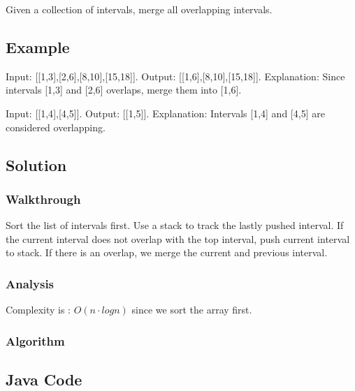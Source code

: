 \documentclass[]{book}
\begin{document}
Given a collection of intervals, merge all overlapping intervals.

\hypertarget{example-17}{%
\subsection{Example}\label{example-17}}

Input: {[}{[}1,3{]},{[}2,6{]},{[}8,10{]},{[}15,18{]}{]}. Output: {[}{[}1,6{]},{[}8,10{]},{[}15,18{]}{]}. Explanation: Since intervals {[}1,3{]} and {[}2,6{]} overlaps, merge them into {[}1,6{]}.

Input: {[}{[}1,4{]},{[}4,5{]}{]}. Output: {[}{[}1,5{]}{]}. Explanation: Intervals {[}1,4{]} and {[}4,5{]} are considered overlapping.

\hypertarget{solution-13}{%
\subsection{Solution}\label{solution-13}}

\hypertarget{walkthrough-17}{%
\subsubsection{Walkthrough}\label{walkthrough-17}}

Sort the list of intervals first. Use a stack to track the lastly pushed interval. If the current interval does
not overlap with the top interval, push current interval to stack. If there is an overlap, we merge the
current and previous interval.

\hypertarget{analysis-19}{%
\subsubsection{Analysis}\label{analysis-19}}

Complexity is : \(O(n \cdot log n)\) since we sort the array first.

\hypertarget{algorithm-19}{%
\subsubsection{Algorithm}\label{algorithm-19}}

\hypertarget{java-code-15}{%
\subsection{Java Code}\label{java-code-15}}
\end{document}
